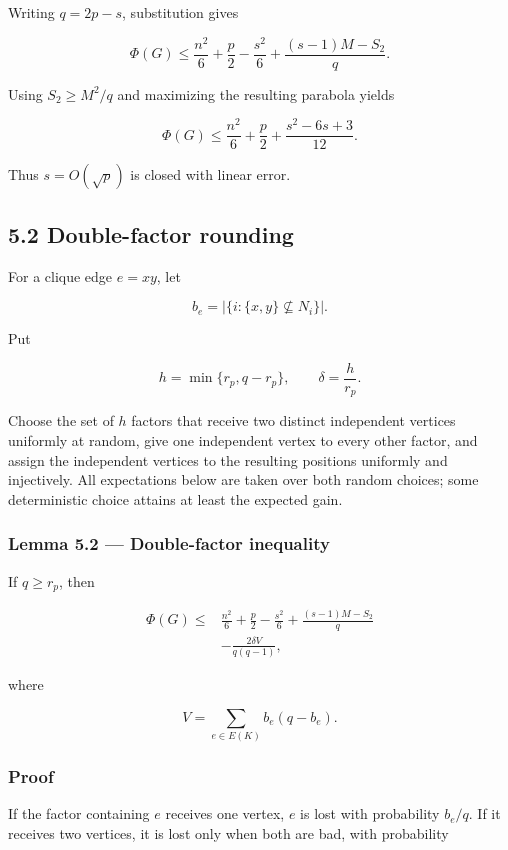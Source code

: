 \documentclass[
  11pt,
]{article}
\begin{document}
Writing \(q=2p-s\), substitution gives

\[
\Phi(G)
\le
\frac{n^2}{6}+\frac p2-\frac{s^2}{6}
+
\frac{(s-1)M-S_2}{q}.
\tag{5.2}
\]

Using \(S_2\ge M^2/q\) and maximizing the resulting parabola yields

\[
\boxed{
\Phi(G)
\le
\frac{n^2}{6}+\frac p2+\frac{s^2-6s+3}{12}.
}
\tag{5.3}
\]

Thus \(s=O(\sqrt p)\) is closed with linear error.

\subsection{5.2 Double-factor rounding}\label{double-factor-rounding}

For a clique edge \(e=xy\), let

\[
b_e=|\{i:\{x,y\}\not\subseteq N_i\}|.
\]

Put

\[
h=\min\{r_p,q-r_p\},
\qquad
\delta=\frac h{r_p}.
\]

Choose the set of \(h\) factors that receive two distinct independent vertices uniformly at random, give one independent vertex to every other factor, and assign the independent vertices to the resulting positions uniformly and injectively. All expectations below are taken over both random choices; some deterministic choice attains at least the expected gain.

\subsubsection{Lemma 5.2 --- Double-factor inequality}\label{lemma-5.2-double-factor-inequality}

If \(q\ge r_p\), then

\[
\boxed{
\begin{aligned}
\Phi(G)
\le{}&
\frac{n^2}{6}+\frac p2-\frac{s^2}{6}
+
\frac{(s-1)M-S_2}{q}\\
&-
\frac{2\delta V}{q(q-1)},
\end{aligned}
}
\tag{5.4}
\]

where

\[
V=\sum_{e\in E(K)}b_e(q-b_e).
\tag{5.5}
\]

\subsubsection{Proof}\label{proof-4}

If the factor containing \(e\) receives one vertex, \(e\) is lost with probability \(b_e/q\). If it receives two vertices, it is lost only when both are bad, with probability
\end{document}
